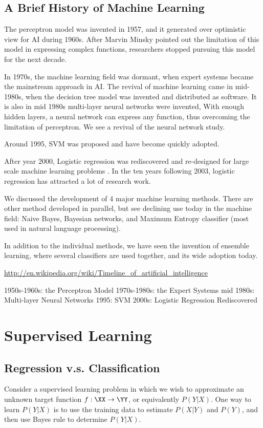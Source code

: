 \documentclass{book}
\begin{document}
\chapter{A Brief History of Machine Learning}
The perceptron model was invented in 1957, and it generated over optimistic view for AI during 1960s. After Marvin Minsky pointed out the limitation of this model in expressing complex functions, researchers stopped pursuing this model for the next decade.

In 1970s, the machine learning field was dormant, when expert systems became the mainstream approach in AI.  The revival of machine learning came in mid-1980s, when the decision tree model was invented and distributed as software. It is also in mid 1980s multi-layer neural networks were invented, With enough hidden layers, a neural network can express any function, thus overcoming the limitation of perceptron. We see a revival of the neural network study.

Around 1995, SVM was proposed and have become quickly adopted.

After year 2000, Logistic regression was rediscovered and re-designed for large scale machine learning problems . In the ten years following 2003, logistic regression has attracted a lot of research work.

We discussed the development of 4 major machine learning methods. There are other method developed in parallel, but see declining use today in the machine field: Naive Bayes, Bayesian networks, and Maximum Entropy classifier (most used in natural language processing). 

In addition to the individual methods, we have seen the invention of ensemble learning, where several classifiers are used together, and its wide adoption today. 


\url{http://en.wikipedia.org/wiki/Timeline_of_artificial_intelligence}

1950s-1960s: the Perceptron Model
1970s-1980s: the Expert Systems
mid 1980s: Multi-layer Neural Networks
1995: SVM
2000s: Logistic Regression Rediscovered






\part{Supervised Learning}
\chapter{Regression v.s. Classification}
Consider a supervised learning problem in which we wish to approximate an unknown target function $f: \XX \to \YY$, or equivalently $P(Y|X)$. One way to learn $P(Y|X)$ is to use the training data to estimate $P(X|Y)$ and $P(Y)$, and then use Bayes rule to determine $P(Y|X)$.
\end{document}
